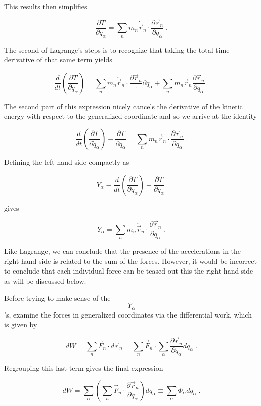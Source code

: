 \documentclass[12pt]{article}
\begin{document}
This results then simplifies 

\[ \frac{\partial T}{\partial {\dot q}_{\alpha}} = \sum_n m_n {\dot {\vec r}}_n \cdot \frac{\partial {{\vec r}}_n}{\partial {q}_{\alpha}} \; .\]

The second of Lagrange's steps is to recognize that taking the total time-derivative of that same term yields 

\[ \frac{d}{dt} \left( \frac{\partial T}{\partial {\dot q}_{\alpha}} \right) = \sum_n m_n {\ddot {\vec r}}_n \cdot \frac{\partial {\vec r}_n} \cdot {\partial q_\alpha} + \sum_n m_n {\dot {\vec r}}_n \frac{\partial {\dot {\vec r}}_n}{\partial q_{\alpha}} \; .\]

The second part of this expression nicely cancels the derivative of the kinetic energy with respect to the generalized coordinate and so we arrive at the identity

\[ \frac{d}{dt} \left( \frac{\partial T}{\partial {\dot q}_{\alpha}} \right) - \frac{\partial T}{\partial q_{\alpha}} = \sum_n m_n {\ddot {\vec r}}_n \cdot \frac{\partial {\vec r}_n}{\partial q_\alpha} \; . \]

Defining the left-hand side compactly as 

\[ Y_{\alpha} \equiv \frac{d}{dt} \left( \frac{\partial T}{\partial {\dot q}_{\alpha}} \right) - \frac{\partial T}{\partial q_{\alpha}} \; \]

gives

\[ Y_{\alpha} = \sum_n m_n {\ddot {\vec r}}_n \cdot \frac{\partial {\vec r}_n}{\partial q_\alpha} \; . \]

Like Lagrange, we can conclude that the presence of the accelerations in the right-hand side is related to the sum of the forces.  However, it would be incorrect to conclude that each individual force can be teased out this the right-hand side as will be discussed below.

Before trying to make sense of the $$Y_{\alpha}$$'s, examine the forces in generalized coordinates via the differential work, which is given by

\[ dW = \sum_n {\vec F}_n \cdot  d {\vec r}_n = \sum_n {\vec F}_n \cdot \sum_{\alpha} \frac{\partial {\vec r}_n}{\partial q_\alpha} dq_{\alpha} \; . \]

Regrouping this last term gives the final expression

\[ dW = \sum_\alpha \left( \sum_n {\vec F}_n \cdot \frac{\partial {\vec r}_n}{\partial q_\alpha} \right) dq_\alpha \equiv \sum_\alpha \Phi_\alpha d q_\alpha \; . \]
\end{document}
